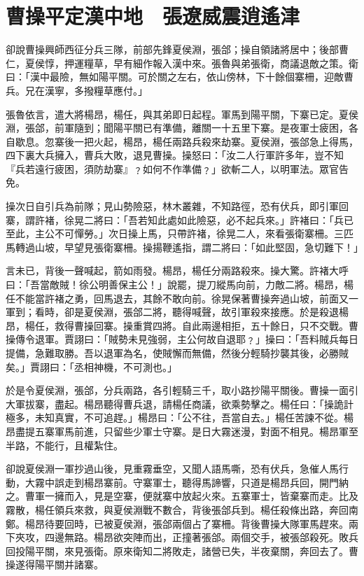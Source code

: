 
\chapter{曹操平定漢中地　張遼威震逍遙津}

卻說曹操興師西征分兵三隊，前部先鋒夏侯淵，張郃；操自領諸將居中；後部曹仁，夏侯惇，押運糧草，早有細作報入漢中來。張魯與弟張衛，商議退敵之策。衛曰：「漢中最險，無如陽平關。可於關之左右，依山傍林，下十餘個寨柵，迎敵曹兵。兄在漢寧，多撥糧草應付。」

張魯依言，遣大將楊昂，楊任，與其弟即日起程。軍馬到陽平關，下寨已定。夏侯淵，張郃，前軍隨到；聞陽平關已有準備，離關一十五里下寨。是夜軍士疲困，各自歇息。忽寨後一把火起，楊昂，楊任兩路兵殺來劫寨。夏侯淵，張郃急上得馬，四下裏大兵擁入，曹兵大敗，退見曹操。操怒曰：「汝二人行軍許多年，豈不知『兵若遠行疲困，須防劫寨』﹖如何不作準備﹖」欲斬二人，以明軍法。眾官告免。

操次日自引兵為前隊；見山勢險惡，林木叢雜，不知路徑，恐有伏兵，即引軍回寨，謂許褚，徐晃二將曰：「吾若知此處如此險惡，必不起兵來。」許褚曰：「兵已至此，主公不可憚勞。」次日操上馬，只帶許褚，徐晃二人，來看張衛寨柵。三匹馬轉過山坡，早望見張衛寨柵。操揚鞭遙指，謂二將曰：「如此堅固，急切難下！」

言未已，背後一聲喊起，箭如雨發。楊昂，楊任分兩路殺來。操大驚。許褚大呼曰：「吾當敵賊！徐公明善保主公！」說罷，提刀縱馬向前，力敵二將。楊昂，楊任不能當許褚之勇，回馬退去，其餘不敢向前。徐晃保著曹操奔過山坡，前面又一軍到；看時，卻是夏侯淵，張郃二將，聽得喊聲，故引軍殺來接應。於是殺退楊昂，楊任，救得曹操回寨。操重賞四將。自此兩邊相拒，五十餘日，只不交戰。曹操傳令退軍。賈詡曰：「賊勢未見強弱，主公何故自退耶﹖」操曰：「吾料賊兵每日提備，急難取勝。吾以退軍為名，使賊懈而無備，然後分輕騎抄襲其後，必勝賊矣。」賈詡曰：「丞相神機，不可測也。」

於是令夏侯淵，張郃，分兵兩路，各引輕騎三千，取小路抄陽平關後。曹操一面引大軍拔寨，盡起。楊昂聽得曹兵退，請楊任商議，欲乘勢擊之。楊任曰：「操詭計極多，未知真實，不可追趕。」楊昂曰：「公不往，吾當自去。」楊任苦諫不從。楊昂盡提五寨軍馬前進，只留些少軍士守寨。是日大霧迷漫，對面不相見。楊昂軍至半路，不能行，且權紮住。

卻說夏侯淵一軍抄過山後，見重霧垂空，又聞人語馬嘶，恐有伏兵，急催人馬行動，大霧中誤走到楊昂寨前。守寨軍士，聽得馬諦響，只道是楊昂兵回，開門納之。曹軍一擁而入，見是空寨，便就寨中放起火來。五寨軍士，皆棄寨而走。比及霧散，楊任領兵來救，與夏侯淵戰不數合，背後張郃兵到。楊任殺條出路，奔回南鄭。楊昂待要回時，已被夏侯淵，張郃兩個占了寨柵。背後曹操大隊軍馬趕來。兩下夾攻，四邊無路。楊昂欲突陣而出，正撞著張郃。兩個交手，被張郃殺死。敗兵回投陽平關，來見張衛。原來衛知二將敗走，諸營已失，半夜棄關，奔回去了。曹操遂得陽平關并諸寨。

